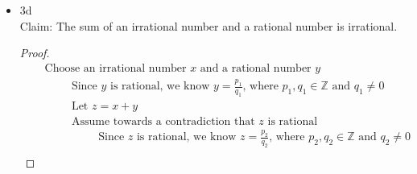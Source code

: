 \documentclass{article}
\begin{document}
\begin{itemize}
\begin{itemize}
\begin{proof}
\begin{align}
                &\quad \hspace{1cm} \text{Since } x_1,x_2,y_1,y_2 \in \mathbb{Q} \text{, we know } a,b \in \mathbb{Q} \\
                &\quad \hspace{1cm} \text{Since } st = a+b \sqrt{2} \text{ and } a,b \in \mathbb{Q} \text{, we know } S \subseteq T \\
                &\quad \text{Choose } t \in T \text{ where } t = x + y \sqrt{2} \text{, and } x,y \in \mathbb{Q} \\
                &\quad \hspace{1cm} \text{Since } 0,1 \in \mathbb{Q} \text{, } 0 \sqrt{2} = 0 \text{ and } 1+0 = 1 \text{, we know } 1 \in T \\
                &\quad \hspace{1cm} \text{Since } t, 1 \in T \text{ and } t = 1 \cdot t \text{, we know } t \in S \\
                &\quad \hspace{1cm} \text{Since } t \in S \text{, we know } T \subseteq S \\
                &\quad \text{Since } S \subseteq T \text{ and } T \subseteq S \text{, we know } S = T
            \end{align}
        \end{proof}
        \item 3d \\
        Claim: The sum of an irrational number and a rational number is irrational.
        \begin{proof}
            \begin{align}
                &\quad \text{Choose an irrational number } x \text{ and a rational number } y \\
                &\quad \hspace{1cm} \text{Since } y \text{ is rational, we know } y = \frac{p_1}{q_1} \text{, where } p_1,q_1 \in \mathbb{Z} \text{ and } q_1 \neq 0 \\
                &\quad \hspace{1cm} \text{Let } z = x + y \\
                &\quad \hspace{1cm} \text{Assume towards a contradiction that } z \text{ is rational} \\
                &\quad \hspace{2cm} \text{Since } z \text{ is rational, we know } z = \frac{p_2}{q_2} \text{, where } p_2,q_2 \in \mathbb{Z} \text{ and } q_2 \neq 0 \\

\end{align}
\end{proof}
\end{itemize}
\end{itemize}
\end{document}
